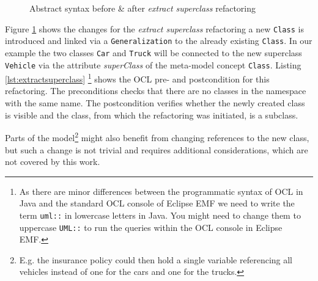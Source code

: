 \documentclass{llncs}
\begin{document}
\begin{figure}
 \caption{Abstract syntax before \& after \textit{extract superclass} refactoring}
 \label{fig:extract}
\end{figure}

Figure \ref{fig:extract} shows the changes for the \textit{extract superclass} refactoring a new \texttt{Class} is 
introduced and linked via a \texttt{Generalization} to the already existing \texttt{Class}. In our example the two 
classes \texttt{Car} and \texttt{Truck} will be connected to the new superclass \texttt{Vehicle} via the attribute 
\textit{superClass} of the meta-model concept \texttt{Class}. Listing \ref{lst:extractsuperclass}
\footnote{As there are minor differences between the programmatic syntax of OCL in Java and the standard OCL console of Eclipse EMF 
we need to write the term \texttt{uml::} in lowercase letters in Java. You might need to change them to uppercase \texttt{UML::} 
to run the queries within the OCL console in Eclipse EMF.} shows the OCL pre- and 
postcondition for this refactoring. The preconditions checks that there are no classes in the namespace with the 
same name. The postcondition verifies whether the newly created class is visible and the class, from which the refactoring was initiated,
is a subclass. 

Parts of the model\footnote{E.g. the insurance policy could then hold a single variable referencing all vehicles instead 
of one for the cars and one for the trucks.} might also benefit from changing references to the new class, but such a change is not 
trivial and requires additional considerations, which are not covered by this work.
\end{document}
